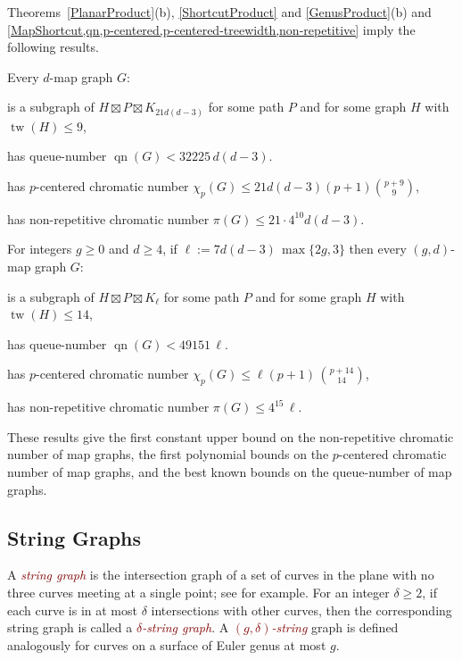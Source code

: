 \documentclass{patmorin}
\newcommand{\defin}[1]{\textcolor{Maroon}{\emph{#1}}}
\DeclareMathOperator{\tw}{tw}
\DeclareMathOperator{\qn}{qn}
\renewcommand{\geq}{\geqslant}
\renewcommand{\leq}{\leqslant}
\begin{document}
Theorems~\ref{PlanarProduct}(b),  \ref{ShortcutProduct} and  \ref{GenusProduct}(b) and \cref{MapShortcut,qn,p-centered,p-centered-treewidth,non-repetitive} imply the following results.

\begin{thm}
\label{PlaneMapPartition}
Every $d$-map graph $G$:
	\begin{compactitem}
		\item is a subgraph of $H \boxtimes P \boxtimes K_{21d(d-3)}$ for some path $P$ and for some graph $H$ with $\tw(H)\leq 9$,
		\item has queue-number $\qn(G) < 32225\, d(d-3)$.
		\item has $p$-centered chromatic number $\chi_p(G) \leq 21d(d-3) (p+1)  \binom{p+9}{9}$,
		\item has non-repetitive chromatic number $ \pi(G) \leq 21 \cdot 4^{10} d(d-3)$.
	\end{compactitem}
\end{thm}

\begin{thm}
\label{MapPartition}
For integers $g\geq 0$ and $d\geq 4$, if $\ell:=  7d(d-3)\, \max\{2g,3\}$ then every $(g,d)$-map graph $G$:
\begin{compactitem}
\item is a subgraph of $H \boxtimes P \boxtimes K_{\ell}$ for some path $P$ and for some graph $H$ with $\tw(H)\leq 14$,
\item has queue-number $\qn(G) <  49151\, \ell $.
\item has $p$-centered chromatic number $\chi_p(G) \leq \ell (p+1)\,  \binom{p+14}{14}$,
\item has non-repetitive chromatic number $ \pi(G) \leq 4^{15}\,\ell $.
\end{compactitem}
\end{thm}

These results give
the first constant upper bound on the non-repetitive chromatic number of map graphs,
the first polynomial bounds on the $p$-centered chromatic number of map graphs, and
the best known bounds on the queue-number of map graphs.

\subsection{String Graphs}

A \defin{string graph} is the intersection graph of a set of curves in the plane with no three curves meeting at a single point; see  \cite{PachToth-DCG02,FP10,FP14} for example. For an integer $\delta\geq 2$, if each curve is in at most $\delta$ intersections with other curves, then the corresponding string graph is called a \defin{$\delta$-string graph}. A \defin{$(g,\delta)$-string} graph is defined analogously for curves on a surface of Euler genus at most $g$.
\end{document}
